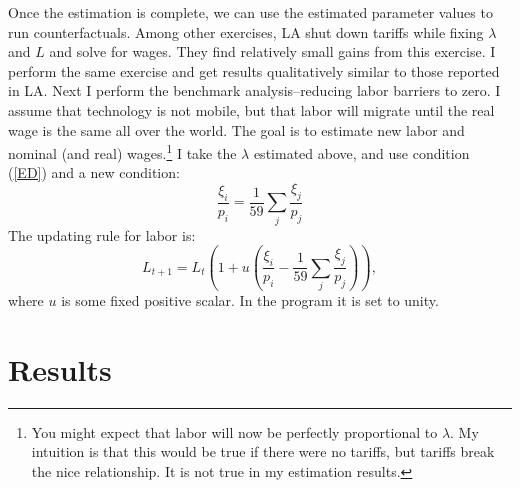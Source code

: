 \documentclass{article}
\begin{document}
Once the estimation is complete, we can use the estimated parameter values to run counterfactuals.  Among other exercises, LA shut down tariffs while fixing $\lambda$ and $L$ and solve for wages.  They find relatively small gains from this exercise.  I perform the same exercise and get results qualitatively similar to those reported in LA.  Next I perform the benchmark analysis--reducing labor barriers to zero.  I assume that technology is not mobile, but that labor will migrate until the real wage is the same all over the world.  The goal is to estimate new labor and nominal (and real) wages.\footnote{You might expect that labor will now be perfectly proportional to $\lambda$.  My intuition is that this would be true if there were no tariffs, but tariffs break the nice relationship.  It is not true in my estimation results.}  I take the $\lambda$ estimated above, and use condition (\ref{ED}) and a new condition:
\begin{equation}
\frac{\xi_i}{p_i} = \frac{1}{59}\sum_j \frac{\xi_j}{p_j}
\end{equation}
The updating rule for labor is:
\[
 L_{t+1} = L_{t} \left(1+u\left(\frac{\xi_i}{p_i} - \frac{1}{59}\sum_j \frac{\xi_j}{p_j}\right)\right),
\]
where $u$ is some fixed positive scalar.  In the program it is set to unity.

\section{Results}
\end{document}
